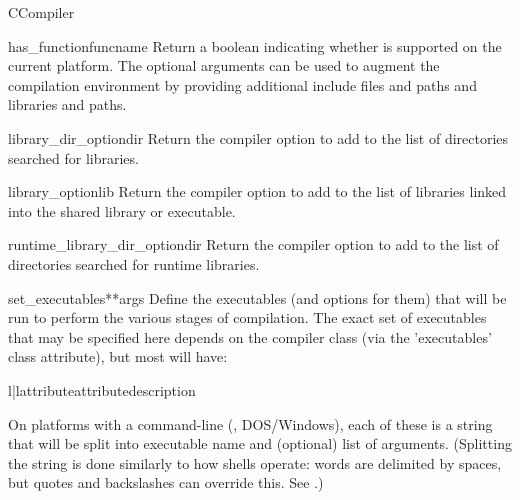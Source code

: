 \documentclass{manual}
\begin{document}
\begin{classdesc}{CCompiler}{}
\begin{methoddesc}{has_function}{funcname }
Return a boolean indicating whether  is supported on
the current platform.  The optional arguments can be used to
augment the compilation environment by providing additional include
files and paths and libraries and paths.
\end{methoddesc}

\begin{methoddesc}{library_dir_option}{dir}
Return the compiler option to add  to the list of
directories searched for libraries.
\end{methoddesc}

\begin{methoddesc}{library_option}{lib}
Return the compiler option to add  to the list of libraries
linked into the shared library or executable.
\end{methoddesc}

\begin{methoddesc}{runtime_library_dir_option}{dir}
Return the compiler option to add  to the list of
directories searched for runtime libraries.
\end{methoddesc}

\begin{methoddesc}{set_executables}{**args}
Define the executables (and options for them) that will be run
to perform the various stages of compilation.  The exact set of
executables that may be specified here depends on the compiler
class (via the 'executables' class attribute), but most will have:

\begin{tableii}{l|l}{attribute}{attribute}{description}
\end{tableii}

On platforms with a command-line (\UNIX, DOS/Windows), each of these
is a string that will be split into executable name and (optional)
list of arguments.  (Splitting the string is done similarly to how
\UNIX{} shells operate: words are delimited by spaces, but quotes and
backslashes can override this.  See
.)
\end{methoddesc}


\end{classdesc}
\end{document}
